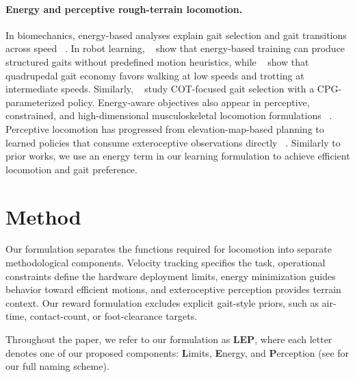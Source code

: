\documentclass{article}
\newcommand{\baselineFour}{LEP}
\begin{document}
    \paragraph{Energy and perceptive rough-terrain locomotion.}
    In biomechanics, energy-based analyses explain gait selection and gait transitions across speed ~\citep{hoytGaitEnergeticsLocomotion1981,raffaltEconomyMovementDynamics2017a,abeEconomicalSpeedEnergetically2015a,schumacher2025emergancenatural}. In robot learning, ~\citep{fuMinimizingEnergyConsumption2022,liangAdaptiveEnergyRegularization2025a} show that energy-based training can produce structured gaits without predefined motion heuristics, while  ~\citep{xiSelectingGaitsEconomical2016,yangFastEfficientLocomotion2022} show that quadrupedal gait economy favors walking at low speeds and trotting at intermediate speeds.
    Similarly, ~\citet{bellegardaAllGaitsLearningAll2024} study COT-focused gait selection with a CPG-parameterized policy. Energy-aware objectives also appear in perceptive, constrained, and high-dimensional musculoskeletal locomotion formulations ~\citep{agarwalLeggedLocomotionChallenging2022,mahankaliMaximizingQuadrupedVelocity2024,milosevic2026sdh}. Perceptive locomotion has progressed from elevation-map-based planning to learned policies that consume exteroceptive observations directly ~\citep{fuCouplingVisionProprioception,yuVisualLocomotionLearningWalk2022,mikiLearningRobustPerceptive2022,agarwalLeggedLocomotionChallenging2022}. Similarly to prior works, we use an energy term in our learning formulation to achieve efficient locomotion and gait preference.

    \section{Method}
    \label{sec:method}

    Our formulation separates the functions required for locomotion into separate methodological components. Velocity tracking specifies the task, operational constraints define the hardware deployment limits, energy minimization guides behavior toward efficient motions, and exteroceptive perception provides terrain context. Our reward formulation excludes explicit gait-style priors, such as air-time, contact-count, or foot-clearance targets.

    Throughout the paper, we refer to our formulation as \textbf{\baselineFour{}}, where each letter denotes one of our proposed components: \textbf{L}imits, \textbf{E}nergy, and \textbf{P}erception (see  for our full naming scheme).
    
\end{document}

